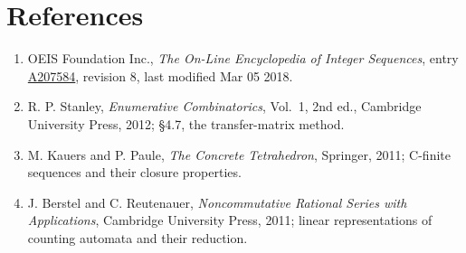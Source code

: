 \documentclass[11pt]{article}
\theoremstyle{definition}
\begin{document}
\section{References}

\begin{enumerate}

\item OEIS Foundation Inc., \emph{The On-Line Encyclopedia of Integer Sequences}, entry \href{https://oeis.org/A207584}{A207584}, revision 8, last modified Mar 05 2018.

\item R. P. Stanley, \emph{Enumerative Combinatorics}, Vol.~1, 2nd ed., Cambridge University Press, 2012; \S4.7, the transfer-matrix method.

\item M. Kauers and P. Paule, \emph{The Concrete Tetrahedron}, Springer, 2011; C-finite sequences and their closure properties.

\item J. Berstel and C. Reutenauer, \emph{Noncommutative Rational Series with Applications}, Cambridge University Press, 2011; linear representations of counting automata and their reduction.

\end{enumerate}
\end{document}
